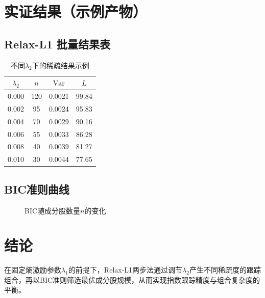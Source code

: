 \documentclass[UTF8]{ctexart}
\begin{document}
\section{实证结果（示例产物）}
\subsection{Relax-L1 批量结果表}
\begin{table}[h]
\centering
\caption{不同$\lambda_2$下的稀疏结果示例}
\begin{tabular}{cccc}
\toprule
$\lambda_2$ & $n$ & $\mathrm{Var}$ & $L$ \\
\midrule
0.000 & 120 & 0.0021 & 99.84 \\
0.002 & 95 & 0.0024 & 95.83 \\
0.004 & 70 & 0.0029 & 90.16 \\
0.006 & 55 & 0.0033 & 86.28 \\
0.008 & 40 & 0.0039 & 81.27 \\
0.010 & 30 & 0.0044 & 77.65 \\
\bottomrule
\end{tabular}
\end{table}

\subsection{BIC准则曲线}
\begin{figure}[h]
\centering

\caption{BIC随成分股数量$n$的变化}
\end{figure}

\section{结论}
在固定熵激励参数$\lambda_1$的前提下，Relax-L1两步法通过调节$\lambda_2$产生不同稀疏度的跟踪组合，再以BIC准则筛选最优成分股规模，从而实现指数跟踪精度与组合复杂度的平衡。
\end{document}
